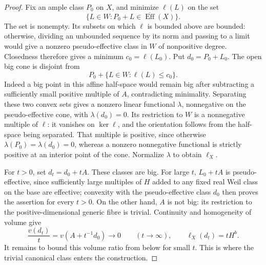 \begin{proof}
Fix an ample class $P_0$ on $X$, and minimize $\ell(L)$ on the set
\[
 \{L\in W:P_0+L\in\overline{\operatorname{Eff}}(X)\}.
\]
The set is nonempty.  Its subsets on which $\ell$ is bounded above
are bounded: otherwise, dividing an unbounded sequence by its norm
and passing to a limit would give a nonzero pseudo-effective class in
$W$ of nonpositive degree.  Closedness therefore gives a minimum
$c_0=\ell(L_0)$.  Put $d_0=P_0+L_0$.
The open big cone is disjoint from
\[
 P_0+\{L\in W:\ell(L)\le c_0\}.
\]
Indeed a big point in this affine half-space would remain big after
subtracting a sufficiently small positive multiple of $A$, contradicting
minimality.  Separating these two convex sets gives a nonzero linear
functional $\lambda$, nonnegative on the pseudo-effective cone, with
$\lambda(d_0)=0$.  Its restriction to $W$ is a nonnegative multiple
of $\ell$: it vanishes on $\ker\ell$, and the orientation follows
from the half-space being separated.  That multiple is positive,
since otherwise $\lambda(P_0)=\lambda(d_0)=0$, whereas a nonzero
nonnegative functional is strictly positive at an interior point of
the cone.  Normalize $\lambda$ to obtain $\ell_X$.

For $t>0$, set $d_t=d_0+tA$.  These classes are big.  For large $t$,
$L_0+tA$ is pseudo-effective, since sufficiently large multiples of
$H$ added to any fixed real Weil class on the base are effective;
convexity with the pseudo-effective class $d_0$ then proves the
assertion for every $t>0$.  On the other hand, $A$ is not big: its
restriction to the positive-dimensional generic fibre is trivial.
Continuity and homogeneity of volume give
\begin{equation}\label{eq:rank:large-calibration-parameter}
 \frac{v(d_t)}t=v(A+t^{-1}d_0)\longrightarrow0
 \qquad(t\longrightarrow\infty),
 \qquad
 \ell_X(d_t)=tH^b.
\end{equation}
It remains to bound this volume ratio from below for small $t$.
This is where the trivial canonical class enters the construction.


\end{proof}
